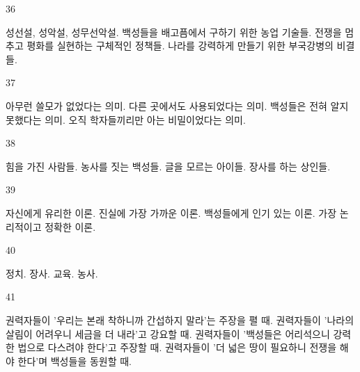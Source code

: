 \documentclass[fs9,seriesFre]{korfarm-base}
\begin{document}
\begin{kfSentenceUnit}{36}{}
\begin{kfChoices}
\kfChoice 성선설, 성악설, 성무선악설.
\kfChoice 백성들을 배고픔에서 구하기 위한 농업 기술들.
\kfChoice 전쟁을 멈추고 평화를 실현하는 구체적인 정책들.
\kfChoice 나라를 강력하게 만들기 위한 부국강병의 비결들.
\end{kfChoices}
\end{kfSentenceUnit}

\begin{kfSentenceUnit}{37}{}
\begin{kfChoices}
\kfChoice 아무런 쓸모가 없었다는 의미.
\kfChoice 다른 곳에서도 사용되었다는 의미.
\kfChoice 백성들은 전혀 알지 못했다는 의미.
\kfChoice 오직 학자들끼리만 아는 비밀이었다는 의미.
\end{kfChoices}
\end{kfSentenceUnit}

\begin{kfSentenceUnit}{38}{}
\begin{kfChoices}
\kfChoice 힘을 가진 사람들.
\kfChoice 농사를 짓는 백성들.
\kfChoice 글을 모르는 아이들.
\kfChoice 장사를 하는 상인들.
\end{kfChoices}
\end{kfSentenceUnit}

\begin{kfSentenceUnit}{39}{}
\begin{kfChoices}
\kfChoice 자신에게 유리한 이론.
\kfChoice 진실에 가장 가까운 이론.
\kfChoice 백성들에게 인기 있는 이론.
\kfChoice 가장 논리적이고 정확한 이론.
\end{kfChoices}
\end{kfSentenceUnit}

\begin{kfSentenceUnit}{40}{}
\begin{kfChoices}
\kfChoice 정치.
\kfChoice 장사.
\kfChoice 교육.
\kfChoice 농사.
\end{kfChoices}
\end{kfSentenceUnit}

\begin{kfSentenceUnit}{41}{}
\begin{kfChoices}
\kfChoice 권력자들이 '우리는 본래 착하니까 간섭하지 말라'는 주장을 펼 때.
\kfChoice 권력자들이 '나라의 살림이 어려우니 세금을 더 내라'고 강요할 때.
\kfChoice 권력자들이 '백성들은 어리석으니 강력한 법으로 다스려야 한다'고 주장할 때.
\kfChoice 권력자들이 '더 넓은 땅이 필요하니 전쟁을 해야 한다'며 백성들을 동원할 때.
\end{kfChoices}
\end{kfSentenceUnit}
\end{document}
